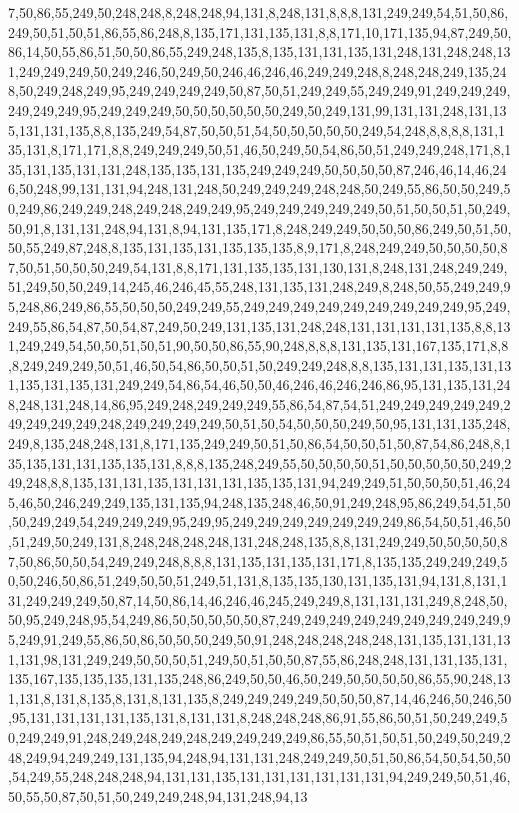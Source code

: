 7,50,86,55,249,50,248,248,8,248,248,94,131,8,248,131,8,8,8,131,249,249,54,51,50,86,249,50,51,50,51,86,55,86,248,8,135,171,131,135,131,8,8,171,10,171,135,94,87,249,50,86,14,50,55,86,51,50,50,86,55,249,248,135,8,135,131,131,135,131,248,131,248,248,131,249,249,249,50,249,246,50,249,50,246,46,246,46,249,249,248,8,248,248,249,135,248,50,249,248,249,95,249,249,249,249,50,87,50,51,249,249,55,249,249,91,249,249,249,249,249,249,95,249,249,249,50,50,50,50,50,50,249,50,249,131,99,131,131,248,131,135,131,131,135,8,8,135,249,54,87,50,50,51,54,50,50,50,50,50,249,54,248,8,8,8,8,131,135,131,8,171,171,8,8,249,249,249,50,51,46,50,249,50,54,86,50,51,249,249,248,171,8,135,131,135,131,131,248,135,135,131,135,249,249,249,50,50,50,50,87,246,46,14,46,246,50,248,99,131,131,94,248,131,248,50,249,249,249,248,248,50,249,55,86,50,50,249,50,249,86,249,249,248,249,248,249,249,95,249,249,249,249,249,50,51,50,50,51,50,249,50,91,8,131,131,248,94,131,8,94,131,135,171,8,248,249,249,50,50,50,86,249,50,51,50,50,55,249,87,248,8,135,131,135,131,135,135,135,8,9,171,8,248,249,249,50,50,50,50,87,50,51,50,50,50,249,54,131,8,8,171,131,135,135,131,130,131,8,248,131,248,249,249,51,249,50,50,249,14,245,46,246,45,55,248,131,135,131,248,249,8,248,50,55,249,249,95,248,86,249,86,55,50,50,50,249,249,55,249,249,249,249,249,249,249,249,249,95,249,249,55,86,54,87,50,54,87,249,50,249,131,135,131,248,248,131,131,131,131,135,8,8,131,249,249,54,50,50,51,50,51,90,50,50,86,55,90,248,8,8,8,131,135,131,167,135,171,8,8,8,249,249,249,50,51,46,50,54,86,50,50,51,50,249,249,248,8,8,135,131,131,135,131,131,135,131,135,131,249,249,54,86,54,46,50,50,46,246,46,246,246,86,95,131,135,131,248,248,131,248,14,86,95,249,248,249,249,249,55,86,54,87,54,51,249,249,249,249,249,249,249,249,249,248,249,249,249,249,50,51,50,54,50,50,50,249,50,95,131,131,135,248,249,8,135,248,248,131,8,171,135,249,249,50,51,50,86,54,50,50,51,50,87,54,86,248,8,135,135,131,131,135,135,131,8,8,8,135,248,249,55,50,50,50,50,51,50,50,50,50,50,249,249,248,8,8,135,131,131,135,131,131,131,135,135,131,94,249,249,51,50,50,50,51,46,245,46,50,246,249,249,135,131,135,94,248,135,248,46,50,91,249,248,95,86,249,54,51,50,50,249,249,54,249,249,249,95,249,95,249,249,249,249,249,249,249,86,54,50,51,46,50,51,249,50,249,131,8,248,248,248,248,131,248,248,135,8,8,131,249,249,50,50,50,50,87,50,86,50,50,54,249,249,248,8,8,8,131,135,131,135,131,171,8,135,135,249,249,249,50,50,246,50,86,51,249,50,50,51,249,51,131,8,135,135,130,131,135,131,94,131,8,131,131,249,249,249,50,87,14,50,86,14,46,246,46,245,249,249,8,131,131,131,249,8,248,50,50,95,249,248,95,54,249,86,50,50,50,50,50,87,249,249,249,249,249,249,249,249,249,95,249,91,249,55,86,50,86,50,50,50,249,50,91,248,248,248,248,248,131,135,131,131,131,131,98,131,249,249,50,50,50,51,249,50,51,50,50,87,55,86,248,248,131,131,135,131,135,167,135,135,135,131,135,248,86,249,50,50,46,50,249,50,50,50,50,86,55,90,248,131,131,8,131,8,135,8,131,8,131,135,8,249,249,249,249,50,50,50,87,14,46,246,50,246,50,95,131,131,131,131,135,131,8,131,131,8,248,248,248,86,91,55,86,50,51,50,249,249,50,249,249,91,248,249,248,249,248,249,249,249,249,86,55,50,51,50,51,50,249,50,249,248,249,94,249,249,131,135,94,248,94,131,131,248,249,249,50,51,50,86,54,50,54,50,50,54,249,55,248,248,248,94,131,131,135,131,131,131,131,131,131,94,249,249,50,51,46,50,55,50,87,50,51,50,249,249,248,94,131,248,94,13